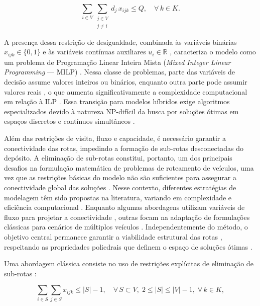 \begin{equation}
    \sum_{i \in V} \sum_{\substack{j \in V \\ j \neq i}} d_j\, x_{ijk} \leq Q, 
    \quad \forall\, k \in K.
    \label{eq:capacidade}
\end{equation}

A presença dessa restrição de desigualdade, combinada às variáveis binárias $x_{ijk} \in \{0,1\}$ e às variáveis contínuas auxiliares $u_i \in \mathbb{R}$ \cite{miller1960integer}, caracteriza o modelo como um problema de Programação Linear Inteira Mista (\textit{Mixed Integer Linear Programming} --- MILP) \cite{Nemhauser1988}. Nessa classe de problemas, parte das variáveis de decisão assume valores inteiros ou binários, enquanto outra parte pode assumir valores reais \cite{Conforti2014}, o que aumenta significativamente a complexidade computacional em relação à ILP \cite{Wolsey1998}. Essa transição para modelos híbridos exige algoritmos especializados devido à natureza NP-difícil da busca por soluções ótimas em espaços discretos e contínuos simultâneos \cite{papadimitriou1998combinatorial}.

Além das restrições de visita, fluxo e capacidade, é necessário garantir a conectividade das rotas, impedindo a formação de sub-rotas desconectadas do depósito. A eliminação de sub-rotas constitui, portanto, um dos principais desafios na formulação matemática de problemas de roteamento de veículos, uma vez que as restrições básicas do modelo não são suficientes para assegurar a conectividade global das soluções \cite{dantzig1954solution}. Nesse contexto, diferentes estratégias de modelagem têm sido propostas na literatura, variando em complexidade e eficiência computacional \cite{Oncan2009}. Enquanto algumas abordagens utilizam variáveis de fluxo para projetar a conectividade \cite{Gouveia1995}, outras focam na adaptação de formulações clássicas para cenários de múltiplos veículos \cite{Bektas2006}. Independentemente do método, o objetivo central permanece garantir a viabilidade estrutural das rotas \cite{Achuthan1996}, respeitando as propriedades poliedrais que definem o espaço de soluções ótimas \cite{Letchford2006}.

Uma abordagem clássica consiste no uso de restrições explícitas de eliminação de sub-rotas \cite{dantzig2009solution}:

\begin{equation}
    \sum_{i \in S} \sum_{j \in S} x_{ijk} \leq |S| - 1, 
    \quad \forall\, S \subset V,\; 2 \leq |S| \leq |V| - 1,\; \forall\, k \in K,
    \label{eq:subciclo}
\end{equation}

